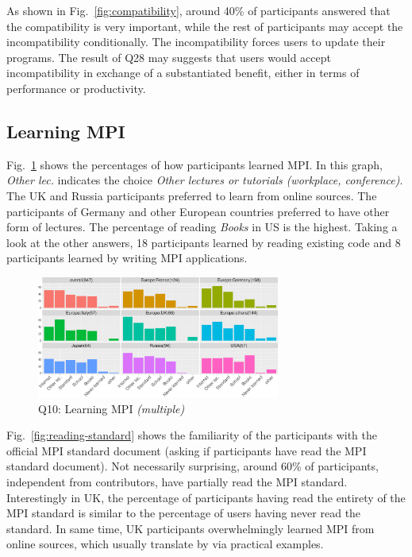 \documentclass[preprint,5p,times]{elsarticle}
\def\myquote#1{{\it #1}}
\def\countries{contributors\xspace{}}%
\begin{document}
As shown in Fig.~\ref{fig:compatibility}, around 40\% of participants answered
that the compatibility is very important, while the rest of participants may
accept the incompatibility conditionally. The incompatibility forces users to
update their programs. The result of Q28 may suggests that users would accept
incompatibility in exchange of a substantiated benefit, either in terms of
performance or productivity.

\subsection{Learning MPI}\label{sec:learning-mpi}

Fig.~\ref{fig:learning-mpi} shows the percentages of how participants learned
MPI. In this graph, \myquote{Other lec.} indicates the choice \myquote{Other
lectures or tutorials (workplace, conference)}. The UK and Russia participants
preferred to learn from online sources. The participants of Germany and other
European countries preferred to have other form of lectures. The percentage of
reading \myquote{Books} in US is the highest. Taking a look at the other
answers, 18 participants learned by reading existing code and 8 participants
learned by writing MPI applications.

\begin{figure}[htb]
\begin{center}
\includegraphics[width=8.0cm]{R-scripts/Q10.pdf}
\vspace{-2mm}
\caption{Q10: Learning MPI {\it(multiple)}}
\label{fig:learning-mpi}
\end{center}
\end{figure}

Fig.~\ref{fig:reading-standard} shows the familiarity of the participants with
the official MPI standard document (asking if participants have read the MPI
standard document). Not necessarily surprising, around 60\% of participants,
independent from \countries, have partially read the MPI standard. Interestingly
in UK, the percentage of participants having read the entirety of the MPI
standard is similar to the percentage of users having never read the standard.
In same time, UK participants overwhelmingly learned MPI from online sources,
which usually translate by via practical examples.
\end{document}
